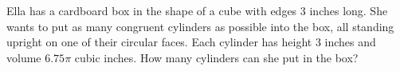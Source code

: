 Ella has a cardboard box in the shape of a cube with edges $3$ inches long. She wants to put as many congruent cylinders as possible into the box, all standing upright on one of their circular faces. Each cylinder has height $3$ inches and volume $6.75\pi$ cubic inches. How many cylinders can she put in the box?
